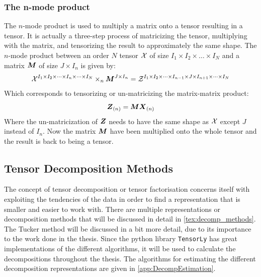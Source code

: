 \subsubsection{The n-mode product}
The $n$-mode product is used to multiply a matrix onto a tensor resulting in a tensor. It is actually a three-step process of matricizing the tensor, multiplying with the matrix, and tensorizing the result to approximately the same shape. The $n$-mode product between an order $N$ tensor $\mathcal{X}$ of size $I_1\times I_2 \times \dots \times I_N$ and a matrix $\boldsymbol{M}$ of size $J\times I_n$ is given by:
\begin{equation}
    \mathcal{X}^{I_1\times I_2\times \dots \times I_n \times \dots \times I_N} \times_n \boldsymbol{M}^{J\times I_n} = \mathcal{Z}^{I_1\times I_2 \times \dots \times I_{n-1} \times J \times I_{n+1} \times \dots \times I_N}
\end{equation}
Which corresponds to tensorizing or un-matricizing the matrix-matrix product:
\begin{equation}
    \boldsymbol{Z}_{(n)} = \boldsymbol{M} \boldsymbol{X}_{(n)}
\end{equation}
Where the un-matricization of $\boldsymbol{Z}$ needs to have the same shape as $\mathcal{X}$ except $J$ instead of $I_n$. Now the matrix $\boldsymbol{M}$ have been multiplied onto the whole tensor and the result is back to being a tensor.

\subsection{Tensor Decomposition Methods} \label{tex:decomp_methods}
The concept of tensor decomposition or tensor factorisation concerns itself with exploiting the tendencies of the data in order to find a representation that is smaller and easier to work with. There are multiple representations or decomposition methods that will be discussed in detail in \autoref{tex:decomp_methods}. The Tucker method will be discussed in a bit more detail, due to its importance to the work done in the thesis. Since the python library \texttt{TensorLy} has great implementations of the different algorithms, it will be used to calculate the decompositions throughout the thesis. The algorithms for estimating the different decomposition representations are given in \autoref{app:DecompEstimation}.

